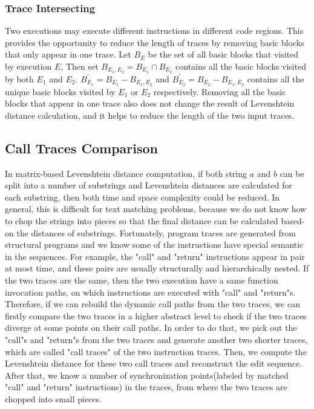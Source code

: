 \documentclass[10pt,journal,cspaper,compsoc]{IEEEtran}
\begin{document}
\subsubsection{Trace Intersecting}
Two executions may execute different instructions in different code
regions. This provides the opportunity to reduce the length of
traces by removing basic blocks that only appear in one trace. Let
$B_E$ be the set of all basic blocks that visited by execution $E$,
Then set $B_{E_1, E_2} = B_{E_1} \cap B_{E_2}$ contains all the
basic blocks visited by both $E_1$ and $E_2$. $B_{E_{1}}^{'} = B_{E_1}
- B_{E_1, E_2}$ and $B_{E_{2}}^{'} = B_{E_2} - B_{E_1, E_2}$ contains
all the unique basic blocks visited by $E_1$ or $E_2$ respectively.
Removing all the basic blocks that appear in one trace also does not
change the result of Levenshtein distance calculation, and it helps
to reduce the length of the two input traces.

\subsection{Call Traces Comparison}
In matrix-based Levenshtein distance computation, if both string $a$ and
$b$ can be split into a number of substrings and Levenshtein
distances are calculated for each substring, then both time and
space complexity could be reduced. In general, this is difficult for
text matching problems, because we do not know how to chop the
strings into pieces so that the final distance can be calculated
based-on the distances of substrings. Fortunately, program traces
are generated from structural programs and we know some of the
instructions have special semantic in the sequences. For example,
the "call" and "return" instructions appear in pair at most time,
and these pairs are usually structurally and hierarchically nested.
If the two traces are the same, then the two execution have a same
function invocation paths, on which instructions are executed with
"call" and "return"s. Therefore, if we can rebuild the dynamic call
paths from the two traces, we can firstly compare the two traces in
a higher abstract level to check if the two traces diverge at some
points on their call paths. In order to do that, we pick out the
"call"s and "return"s from the two traces and generate
another two shorter traces, which are called "call traces" of the
two instruction traces. Then, we compute the Levenshtein distance
for these two call traces and reconstruct the edit sequence. After
that, we know a number of synchronization points(labeled by matched
"call" and "return" instructions) in the traces, from where the two
traces are chopped into small pieces.
\end{document}
